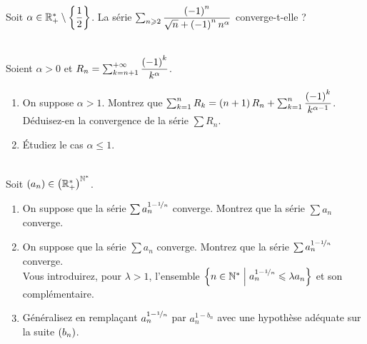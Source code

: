 \begin{exo}~\\
Soit \(\alpha\in\mathbb{R}_+^*\setminus\left\lbrace\dfrac{1}{2}\right\rbrace\). La série \(\sum_{n\geqslant2}\dfrac{\left(-1\right)^n}{\sqrt{n}+\left(-1\right)^nn^\alpha}\) converge-t-elle ?
\end{exo}

\begin{corr}
\end{corr}

\begin{exo}~\\
Soient \(\alpha>0\) et \(R_n=\sum_{k=n+1}^{+\infty}\dfrac{\left(-1\right)^k}{k^\alpha}\).

\begin{enumerate}
    \item On suppose \(\alpha>1\). Montrez que \(\sum_{k=1}^nR_k=\left(n+1\right)R_n+\sum_{k=1}^n\dfrac{\left(-1\right)^k}{k^{\alpha-1}}\). Déduisez-en la convergence de la série \(\sum R_n\). \\
    \item Étudiez le cas \(\alpha\leq1\).
\end{enumerate}
\end{exo}

\begin{corr}
\end{corr}

\begin{exo}~\\
Soit \(\left(a_n\right)\in\left(\mathbb{R}_+^*\right)^{\mathbb{N}^*}\).

\begin{enumerate}
    \item On suppose que la série \(\sum a_n^{1-\nicefrac{1}{n}}\) converge. Montrez que la série \(\sum a_n\) converge. \\
    \item On suppose que la série \(\sum a_n\) converge. Montrez que la série \(\sum a_n^{1-\nicefrac{1}{n}}\) converge. \\ Vous introduirez, pour \(\lambda>1\), l'ensemble \(\left\lbrace n\in\mathbb{N}^*\;\middle|\; a_n^{1-\nicefrac{1}{n}}\leqslant\lambda a_n\right\rbrace\) et son complémentaire. \\
    \item Généralisez en remplaçant \(a_n^{1-\nicefrac{1}{n}}\) par \(a_n^{1-b_n}\) avec une hypothèse adéquate sur la suite \(\left(b_n\right)\).
\end{enumerate}
\end{exo}

